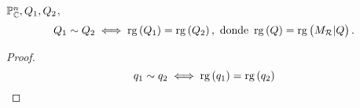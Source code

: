 \begin{prop}
    $\mathbb{P}_{\mathbb{C}}^n, Q_1, Q_2$,
    \[
        Q_1 \sim Q_2 \iff \operatorname{rg}\left( Q_1 \right) = \operatorname{rg}\left( Q_2 \right),\text{ donde }\operatorname{rg}\left( Q \right) = \operatorname{rg}\left( M_{\mathcal{R}} | Q \right).
    \]
\end{prop}
\begin{proof}
    \[ q_1 \sim q_2 \iff \operatorname{rg} \left( q_1 \right) = \operatorname{rg} \left( q_2 \right) \]
\end{proof}
